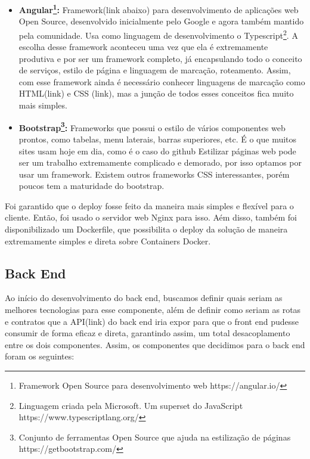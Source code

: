 \documentclass[11pt,twoside]{article}
\begin{document}
\begin{itemize}
  \item \textbf{Angular\footnote{Framework Open Source para desenvolvimento web https://angular.io/}:} Framework(link abaixo) para desenvolvimento de aplicações web Open Source, desenvolvido inicialmente pelo Google e agora também mantido pela comunidade. Usa como linguagem de desenvolvimento o
  Typescript\footnote{Linguagem criada pela Microsoft. Um superset do JavaScript https://www.typescriptlang.org/}. A escolha desse framework aconteceu uma vez que ela é extremamente produtiva e por ser um framework completo, já encapsulando todo o conceito de serviços, estilo de página e 
  linguagem de marcação, roteamento. Assim, com esse framework ainda é necessário conhecer linguagens de marcação como HTML(link) e CSS (link), mas a junção de todos esses conceitos fica muito mais simples.
  \item \textbf{Bootstrap\footnote{Conjunto de ferramentas Open Source que ajuda na estilização de páginas https://getbootstrap.com/}:} Frameworks que possui o estilo de vários componentes web prontos, como tabelas, menu laterais, barras superiores, etc. É o que muitos sites usam hoje em dia, como é o caso do github
  Estilizar páginas web pode ser um trabalho extremamente complicado e demorado, por isso optamos por usar um framework. Existem outros frameworks CSS interessantes, porém poucos tem a maturidade do bootstrap.
\end{itemize}

Foi garantido que o deploy fosse feito da maneira mais simples e flexível para o cliente. Então, foi usado o servidor web Nginx para isso. Aém disso, também foi disponibilizado um Dockerfile, que possibilita
o deploy da solução de maneira extremamente simples e direta sobre Containers Docker.

\subsection{Back End}

Ao início do desenvolvimento do back end, buscamos definir quais seriam as melhores tecnologias para esse componente, além de definir como seriam as rotas e contratos que a API(link) do back end iria expor
para que o front end pudesse consumir de forma eficaz e direta, garantindo assim, um total desacoplamento entre os dois componentes. Assim, os componentes que decidimos para o back end foram os seguintes:
\end{document}
